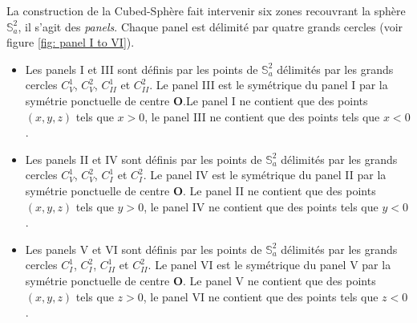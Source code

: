 La construction de la Cubed-Sphère fait intervenir six zones recouvrant la sphère $\mathbb{S}_a^2$, il s'agit des \textit{panels}. Chaque panel est délimité par quatre grands cercles (voir figure \ref{fig: panel I to VI}).

\begin{definition}
\begin{itemize}
\item Les panels I et III sont définis par les points de $\mathbb{S}_a^2$ délimités par les grands cercles $C_V^1$, $C_V^2$, $C_{II}^1$ et $C_{II}^2$. Le panel III est le symétrique du panel I par la symétrie ponctuelle de centre $\mathbf{O}$.Le panel I ne contient que des points $(x,y,z)$ tels que $x>0$, le panel III ne contient que des points tels que $x<0$.
\item Les panels II et IV sont définis par les points de $\mathbb{S}_a^2$ délimités par les grands cercles $C_V^1$, $C_V^2$, $C_{I}^1$ et $C_{I}^2$. Le panel IV est le symétrique du panel II par la symétrie ponctuelle de centre $\mathbf{O}$. Le panel II ne contient que des points $(x,y,z)$ tels que $y>0$, le panel IV ne contient que des points tels que $y<0$.
\item Les panels V et VI sont définis par les points de $\mathbb{S}_a^2$ délimités par les grands cercles $C_I^1$, $C_I^2$, $C_{II}^1$ et $C_{II}^2$. Le panel VI est le symétrique du panel V par la symétrie ponctuelle de centre $\mathbf{O}$. Le panel V ne contient que des points $(x,y,z)$ tels que $z>0$, le panel VI ne contient que des points tels que $z<0$.
\end{itemize}
\end{definition}






